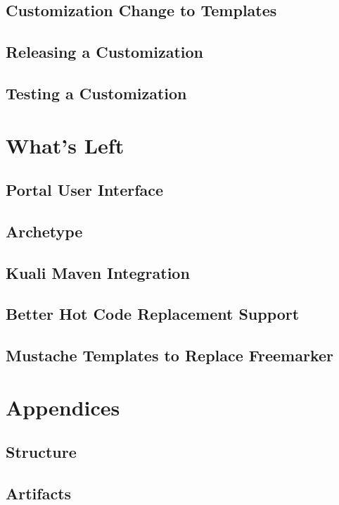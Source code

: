 \documentclass[12pt]{report}
\begin{document}
\subsection{Customization Change to Templates}

\subsection{Releasing a Customization}

\subsection{Testing a Customization}

\section{What's Left}

\subsection{Portal User Interface}

\subsection{Archetype}

\subsection{Kuali Maven Integration}

\subsection{Better Hot Code Replacement Support}

\subsection{Mustache Templates to Replace Freemarker}

\section{Appendices}
\subsection{Structure}

\subsection{Artifacts}
\end{document}

